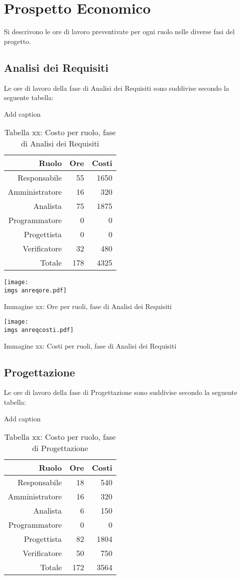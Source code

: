 \section{Prospetto Economico}
Si descrivono le ore di lavoro preventivate per ogni ruolo nelle diverse fasi del progetto.
\subsection{Analisi dei Requisiti}
Le ore di lavoro della fase di Analisi dei Requisiti sono suddivise secondo la seguente tabella:

\begin{table}[htbp]
  \centering
  \caption{Add caption}
    \begin{tabular}{rrr}
    \toprule
		Ruolo & Ore & Costi \\
    \midrule
    Responsabile & 55 & 1650 \\
    Amministratore & 16 & 320 \\
    Analista & 75 & 1875 \\
    Programmatore & 0 & 0 \\
    Progettista & 0 & 0 \\
    Verificatore & 32 & 480 \\
    Totale & 178 & 4325 \\
    \bottomrule
    \end{tabular}%
  \label{tab:addlabel}%
  \caption{Tabella xx: Costo per ruolo, fase di Analisi dei Requisiti}
\end{table}%


\texttt{[image: \\imgs anreqore.pdf]}
\caption{Immagine xx: Ore per ruoli, fase di Analisi dei Requisiti}

\texttt{[image: \\imgs anreqcosti.pdf]}
\caption{Immagine xx: Costi per ruoli, fase di Analisi dei Requisiti}

\subsection{Progettazione}
Le ore di lavoro della fase di Progettazione sono suddivise secondo la seguente tabella:

\begin{table}[htbp]
  \centering
  \caption{Add caption}
    \begin{tabular}{rrr}
    \toprule
    Ruolo & Ore   & Costi \\
    \midrule
    Responsabile & 18    & 540 \\
    Amministratore & 16    & 320 \\
    Analista & 6     & 150 \\
    Programmatore & 0     & 0 \\
    Progettista & 82    & 1804 \\
    Verificatore & 50    & 750 \\
    Totale & 172   & 3564 \\
    \bottomrule
    \end{tabular}%
  \label{tab:addlabel}%
\caption{Tabella xx: Costo per ruolo, fase di Progettazione}
\end{table}%


